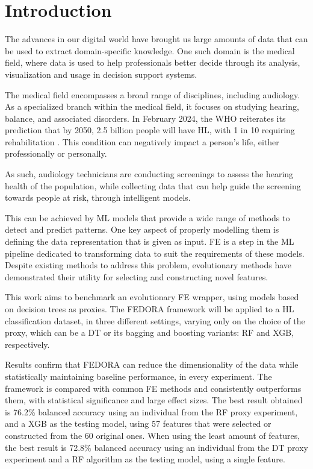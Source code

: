 \section{Introduction}
\glsresetall
The advances in our digital world have brought us large amounts of data that can be used to extract domain-specific knowledge. One such domain is the medical field, where data is used to help professionals better decide through its analysis, visualization and usage in decision support systems.

The medical field encompasses a broad range of disciplines, including audiology. As a specialized branch within the medical field, it focuses on studying hearing, balance, and associated disorders. In February 2024, the \gls{WHO} reiterates its prediction that by 2050, 2.5 billion people will have \gls{HL}, with 1 in 10 requiring rehabilitation \cite{whohl}. This condition can negatively impact a person's life, either professionally or personally.

As such, audiology technicians are conducting screenings to assess the hearing health of the population, while collecting data that can help guide the screening towards people at risk, through intelligent models.

This can be achieved by \gls{ML} models that provide a wide range of methods to detect and predict patterns. One key aspect of properly modelling them is defining the data representation that is given as input. \gls{FE} is a step in the \gls{ML} pipeline dedicated to transforming data to suit the requirements of these models. Despite existing methods to address this problem, evolutionary methods have demonstrated their utility for selecting and constructing novel features.

This work aims to benchmark an evolutionary \gls{FE} wrapper, using models based on decision trees as proxies. The FEDORA framework will be applied to a \gls{HL} classification dataset, in three different settings, varying only on the choice of the proxy, which can be a \gls{DT} or its bagging and boosting variants: \gls{RF} and \gls{XGB}, respectively.

Results confirm that FEDORA can reduce the dimensionality of the data while statistically maintaining baseline performance, in every experiment. The framework is compared with common \gls{FE} methods and consistently outperforms them, with statistical significance and large effect sizes. The best result obtained is 76.2\% balanced accuracy using an individual from the \gls{RF} proxy experiment, and a \gls{XGB} as the testing model, using 57 features that were selected or constructed from the 60 original ones. When using the least amount of features, the best result is 72.8\% balanced accuracy using an individual from the \gls{DT} proxy experiment and a \gls{RF} algorithm as the testing model, using a single feature.





